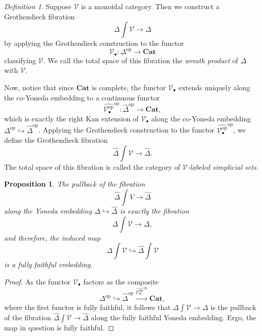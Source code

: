 \documentclass[leqno]{article}
\numberwithin{equation}{subsection}
\theoremstyle{plain}   %
\newtheorem{prop}[equation]{Proposition}
\theoremstyle{remark}
\newtheorem{defn}[equation]{Definition}
\theoremstyle{plain}
\newcommand{\op}{\ensuremath{\mathrm{op}}}
\newcommand{\Cat}{\ensuremath{\mathbf{Cat}}}
\newcommand{\psh}[1]{\ensuremath{\widehat{#1}}}
\begin{document}
\begin{defn}
	Suppose \(\mathcal{V}\) is a monoidal category.  Then we construct a Grothendieck fibration \[\Delta\int\mathcal{V}\to \Delta\] by applying the Grothendieck construction to the functor \[\mathcal{V}_\bullet:\Delta^\op\to \Cat\] classifying \(\mathcal{V}\). We call the total space of this fibration the \emph{wreath product} of \(\Delta\) with \(\mathcal{V}\).

	Now, notice that since \(\Cat\) is complete, the functor \(\mathcal{V}_\bullet\) extends uniquely along the co-Yoneda embedding to a continuous functor 
	\[\psh{\mathcal{V}^\op_\bullet}^\op: \psh{\Delta}^\op \to \Cat,\]
	which is exactly the right Kan extension of \(\mathcal{V}_\bullet\) along the co-Yoneda embedding \(\Delta^\op \hookrightarrow \psh{\Delta}^\op\).  Applying the Grothendieck construction to the functor \(\psh{\mathcal{V}^\op_\bullet}^\op\), we define the Grothendieck fibration \[\psh{\Delta}\int \mathcal{V} \to \psh{\Delta}.\] The total space of this fibration is called the category of \emph{\(\mathcal{V}\)-labeled simplicial sets}.
	


\end{defn}
\begin{prop} The pullback of the fibration \[\psh{\Delta}\int V \to \psh{\Delta}\] along the Yoneda embedding \(\Delta\hookrightarrow \psh{\Delta}\) is exactly the fibration \[\Delta\int\mathcal{V}\to \Delta,\] and therefore, the induced map \[\Delta\int\mathcal{V}\hookrightarrow \psh{\Delta}\int\mathcal{V}\] is a fully faithful embedding.
\end{prop}
\begin{proof}  As the functor \(\mathcal{V}_\bullet\) factors as the composite 
	\[\Delta^\op \hookrightarrow \psh{\Delta}^\op \xrightarrow{\psh{\mathcal{V}^\op_\bullet}^\op} \Cat,\] where the first functor is fully faithful, it follows that \(\Delta\int \mathcal{V} \to \Delta\) is the pullback of the fibration \(\psh{\Delta}\int \mathcal{V} \to \psh{\Delta}\) along the fully faithful Yoneda embedding.  Ergo, the map in question is fully faithful.  
\end{proof}
\end{document}
